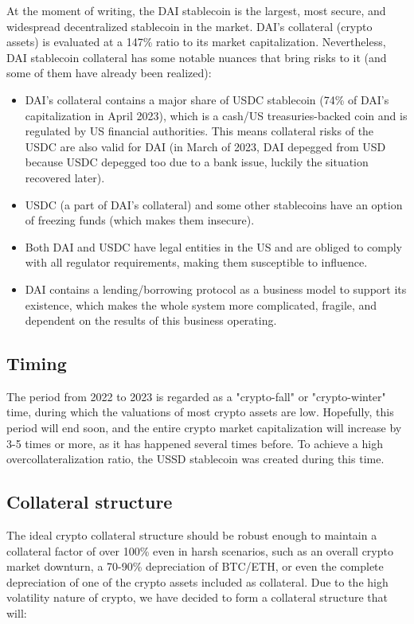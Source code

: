 At the moment of writing, the DAI stablecoin is the largest, most secure, and widespread 
decentralized stablecoin in the market. DAI's collateral (crypto assets) is evaluated at a 
147\% ratio to its market capitalization. Nevertheless, DAI stablecoin collateral has some 
notable nuances that bring risks to it (and some of them have already been realized):
\begin{itemize}
  \item DAI's collateral contains a major share of USDC stablecoin (74\% of DAI's capitalization 
  in April 2023), which is a cash/US treasuries-backed coin and is regulated by US financial authorities. 
  This means collateral risks of the USDC are also valid for DAI (in March of 2023, DAI depegged 
  from USD because USDC depegged too due to a bank issue, luckily the situation recovered later).
  \item USDC (a part of DAI's collateral) and some other stablecoins have an option of freezing 
  funds (which makes them insecure).
  \item Both DAI and USDC have legal entities in the US and are obliged to comply with all 
  regulator requirements, making them susceptible to influence.
  \item DAI contains a lending/borrowing protocol as a business model to support its existence, 
  which makes the whole system more complicated, fragile, and dependent on the results of this 
  business operating.
\end{itemize}

\subsection{Timing}

The period from 2022 to 2023 is regarded as a "crypto-fall" or "crypto-winter" time, during 
which the valuations of most crypto assets are low. Hopefully, this period will end soon, 
and the entire crypto market capitalization will increase by 3-5 times or more, as it has 
happened several times before. To achieve a high overcollateralization ratio, the USSD 
stablecoin was created during this time.

\subsection{Collateral structure}

The ideal crypto collateral structure should be robust enough to maintain a collateral factor 
of over 100\% even in harsh scenarios, such as an overall crypto market downturn, a 70-90\% 
depreciation of BTC/ETH, or even the complete depreciation of one of the crypto assets included 
as collateral. Due to the high volatility nature of crypto, we have decided to form a collateral 
structure that will:

